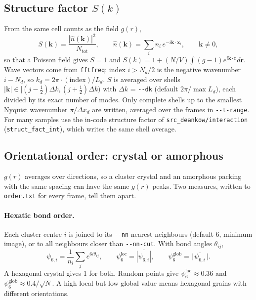 \documentclass[11pt]{article}
\newcommand{\code}[1]{\texttt{#1}}
\begin{document}
\subsection{\texorpdfstring{Structure factor $S(k)$}{Structure factor S(k)}}
From the same cell counts as the field $g(r)$,
\begin{equation}
  S(\mathbf k) = \frac{|\hat n(\mathbf k)|^2}{N_{\mathrm{tot}}}, \qquad
  \hat n(\mathbf k) = \sum_i n_i\,e^{-i\mathbf k\cdot\mathbf x_i}, \qquad \mathbf k\ne0 ,
\end{equation}
so that a Poisson field gives $S=1$ and
$S(k)=1+(N/V)\int(g-1)e^{i\mathbf k\cdot\mathbf r}d\mathbf r$. Wave vectors come
from \code{fftfreq}: index $i>N_d/2$ is the negative wavenumber $i-N_d$, so
$k_d=2\pi\cdot(\text{index})/L_d$. $S$ is averaged over shells
$|\mathbf k|\in[(j-\tfrac12)\Delta k,(j+\tfrac12)\Delta k)$ with
$\Delta k$ = \code{-{}-dk} (default $2\pi/\max L_d$), each divided by its exact
number of modes. Only complete shells up to the smallest Nyquist wavenumber
$\pi/\Delta x_d$ are written, averaged over the frames in \code{-{}-t-range}.
For many samples use the in-code structure factor of
\code{src\_deankow/interaction} (\code{struct\_fact\_int}), which writes the same
shell average.

\subsection{Orientational order: crystal or amorphous}
$g(r)$ averages over directions, so a cluster crystal and an amorphous packing
with the same spacing can have the same $g(r)$ peaks. Two measures, written to
\code{order.txt} for every frame, tell them apart.

\paragraph{Hexatic bond order.} Each cluster centre $i$ is joined to its
\code{-{}-nn} nearest neighbours (default 6, minimum image), or to all
neighbours closer than \code{-{}-nn-cut}. With bond angles $\theta_{ij}$,
\begin{equation}
  \psi_{6,i} = \frac1{n_i}\sum_j e^{6i\theta_{ij}} ,\qquad
  \psi_6^{\mathrm{loc}} = \overline{|\psi_{6,i}|},\qquad
  \psi_6^{\mathrm{glob}} = \bigl|\,\overline{\psi_{6,i}}\,\bigr| .
\end{equation}
A hexagonal crystal gives 1 for both. Random points give
$\psi_6^{\mathrm{loc}}\approx0.36$ and $\psi_6^{\mathrm{glob}}\approx0.4/\sqrt N$.
A high local but low global value means hexagonal grains with different
orientations.
\end{document}
